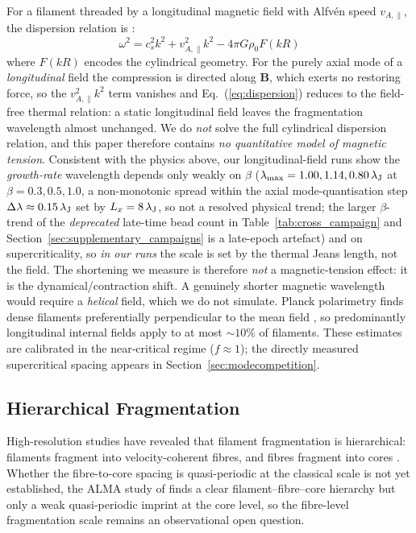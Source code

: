 \documentclass[usenatbib,twoside,twocolumn]{mnras}
\begin{document}
For a filament threaded by a longitudinal magnetic field with Alfv\'en speed $v_{A,\parallel}$, the dispersion relation is \citep{Nakamura1993}:
\begin{equation}
\omega^2 = c_s^2 k^2 + v_{A,\parallel}^2 k^2 - 4\pi G\rho_0 F(kR)
\label{eq:dispersion}
\end{equation}
where $F(kR)$ encodes the cylindrical geometry. For the purely axial mode of a \emph{longitudinal} field the compression is directed along $\mathbf{B}$, which exerts no restoring force, so the $v_{A,\parallel}^2k^2$ term vanishes and Eq.~(\ref{eq:dispersion}) reduces to the field-free thermal relation: a static longitudinal field leaves the fragmentation wavelength almost unchanged. We do \emph{not} solve the full cylindrical dispersion relation, and this paper therefore contains \emph{no quantitative model of magnetic tension}. Consistent with the physics above, our longitudinal-field runs show the \emph{growth-rate} wavelength depends only weakly on $\beta$ ($\lambda_{\rm max}=1.00,1.14,0.80\,\lambda_{\rm J}$ at $\beta=0.3,0.5,1.0$, a non-monotonic spread within the axial mode-quantisation step $\Delta\lambda\approx0.15\,\lambda_{\rm J}$ set by $L_x=8\,\lambda_{\rm J}$, so not a resolved physical trend; the larger $\beta$-trend of the \emph{deprecated} late-time bead count in Table~\ref{tab:cross_campaign} and Section~\ref{sec:supplementary_campaigns} is a late-epoch artefact) and on supercriticality, so \emph{in our runs} the scale is set by the thermal Jeans length, not the field. The shortening we measure is therefore \emph{not} a magnetic-tension effect: it is the dynamical/contraction shift. A genuinely shorter magnetic wavelength would require a \emph{helical} field, which we do not simulate. Planck polarimetry finds dense filaments preferentially perpendicular to the mean field \citep{Jadhav2026}, so predominantly longitudinal internal fields apply to at most $\sim10\%$ of filaments. These estimates are calibrated in the near-critical regime ($f\approx1$); the directly measured supercritical spacing appears in Section~\ref{sec:modecompetition}.

\subsection{Hierarchical Fragmentation}

High-resolution studies have revealed that filament fragmentation is hierarchical: filaments fragment into velocity-coherent fibres, and fibres fragment into cores \citep{Hacar2013,Hacar2018,Yang2024}. Whether the fibre-to-core spacing is quasi-periodic at the classical scale is not yet established, the ALMA study of \citet{Yang2024} finds a clear filament--fibre--core hierarchy but only a weak quasi-periodic imprint at the core level, so the fibre-level fragmentation scale remains an observational open question.
\end{document}
